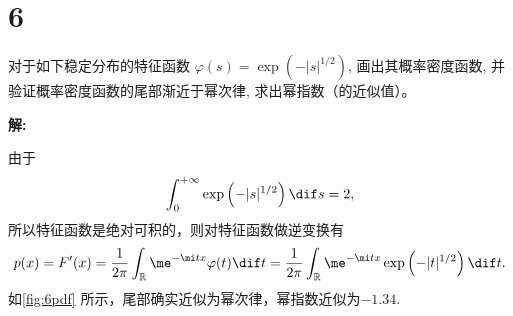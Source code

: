 \documentclass[12pt,a4]{ctexart}
\begin{document}
\section{6}

对于如下稳定分布的特征函数 $\varphi(s)= \exp\left(-|s|^{1 / 2}\right)$, 画出其概率密度函数, 并 验证概率密度函数的尾部渐近于幂次律, 求出幂指数（的近似值）。

\textsf{\hspace{-2em}\sf  \textbf{解:}}

由于
\begin{equation}
	\int^{+\infty}_0 \exp\left(-|s|^{1 / 2}\right) \dif s = 2,
\end{equation}
所以特征函数是绝对可积的，则对特征函数做逆变换有\cite[P190]{wangzikun}
\begin{equation}
	p(x)=F^{\prime}(x)=\frac{1}{2 \pi} \int_{\mathbb{R}} \me^{-\mi t x} \varphi(t) \dif t = \frac{1}{2 \pi} \int_{\mathbb{R}} \me^{-\mi t x} \exp\left(-|t|^{1 / 2}\right) \dif t.
\end{equation}
如\cref{fig:6pdf} 所示，尾部确实近似为幂次律，幂指数近似为$-1.34$.
\end{document}

